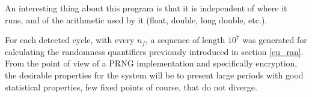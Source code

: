 An interesting thing about this program is that it is independent of where it runs, and of the arithmetic used by it (float, double, long double, etc.).

For each detected cycle, with every $n_f$, a sequence of length $10^7$ was generated for calculating the randomness quantifiers previously introduced in section \ref{cu_ran}. 
From the point of view of a PRNG implementation and specifically encryption, the desirable properties for the system will be to present large periods with good statistical properties, few fixed
points of course, that do not diverge.